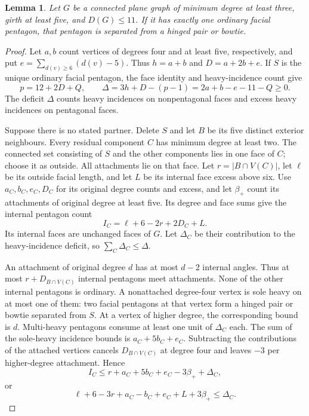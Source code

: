 \documentclass[11pt]{article}
\newtheorem{lemma}[theorem]{Lemma}
\theoremstyle{remark}
\numberwithin{equation}{section}
\numberwithin{table}{section}
\begin{document}
\begin{lemma}\label{lem:unique-ordinary-partner}
Let $G$ be a connected plane graph of minimum degree at least three,
girth at least five, and $D(G)\le11$. If it has exactly one ordinary
facial pentagon, that pentagon is separated from a hinged pair or bowtie.
\end{lemma}
\begin{proof}
Let $a,b$ count vertices of degrees four and at least five, respectively,
and put $e=\sum_{d(v)\ge6}(d(v)-5)$. Thus $h=a+b$ and
$D=a+2b+e$. If $S$ is the unique ordinary facial pentagon, the face
identity and heavy-incidence count give
\[
 p=12+2D+Q,\qquad
 \Delta=3h+D-(p-1)=2a+b-e-11-Q\ge0.
\]
The deficit $\Delta$ counts heavy incidences on nonpentagonal faces
and excess heavy incidences on pentagonal faces.

Suppose there is no stated partner. Delete $S$ and let $B$ be its
five distinct exterior neighbours. Every residual component $C$ has
minimum degree at least two. The connected set consisting of $S$ and
the other components lies in one face of $C$; choose it as outside.
All attachments lie on that face. Let $r=|B\cap V(C)|$, let $\ell$
be its outside facial length, and let $L$ be its internal face excess
above six. Use $a_C,b_C,e_C,D_C$ for its original degree counts and
excess, and let $\beta_+$ count its attachments of original degree at
least five. Its degree and face sums give the internal pentagon count
\[
 I_C=\ell+6-2r+2D_C+L.
\]
Its internal faces are unchanged faces of $G$. Let $\Delta_C$ be
their contribution to the heavy-incidence deficit, so
$\sum_C\Delta_C\le\Delta$.

An attachment of original degree $d$ has at most $d-2$ internal
angles. Thus at most $r+D_{B\cap V(C)}$ internal pentagons meet
attachments. None of the other internal pentagons is ordinary. A
nonattached degree-four vertex is sole heavy on at most one of them:
two facial pentagons at that vertex form a hinged pair or bowtie
separated from $S$. At a vertex of higher degree, the corresponding bound is $d$.
Multi-heavy pentagons consume at least one unit of $\Delta_C$ each.
The sum of the sole-heavy incidence bounds is $a_C+5b_C+e_C$.
Subtracting the contributions of the attached vertices cancels $D_{B\cap V(C)}$ at degree four and leaves $-3$
per higher-degree attachment. Hence
\[
 I_C\le r+a_C+5b_C+e_C-3\beta_++\Delta_C,
\]
or
\begin{equation}\label{eq:unique-ordinary-component}
 \ell+6-3r+a_C-b_C+e_C+L+3\beta_+\le\Delta_C.
\end{equation}


\end{proof}
\end{document}
